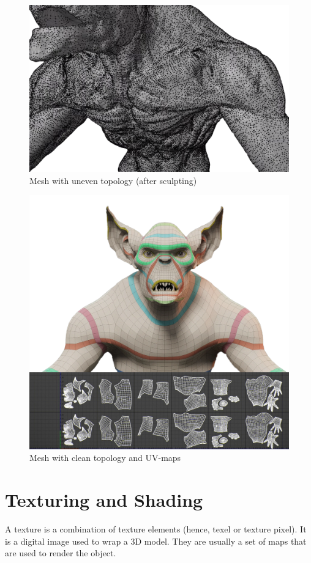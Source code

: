 \documentclass[12pt,twoside]{report}
\begin{document}
\begin{figure}[hp]
    \centering
    \includegraphics[width=45ex]{graphics/bfRetopo.png}
    \caption[Mesh with uneven topology]{Mesh with uneven topology (after sculpting) \hspace{15ex} \\  }
    \label{fig:bfRetopo}
\end{figure}

\begin{figure}[hp]
    \centering
    \includegraphics[width=45ex]{graphics/aftRetopo.png}
    \caption[Mesh with clean topology and UV-maps]{Mesh with clean topology and UV-maps \hspace{15ex} \\  }
    \label{fig:aftRetopo}
\end{figure}

\section{Texturing and Shading}
\label{sec:texturingShading}
A texture is a combination of texture elements (hence, texel or texture pixel). It is a digital image used to wrap a 3D model. They are usually a set of maps that are used to render the object.
\end{document}
